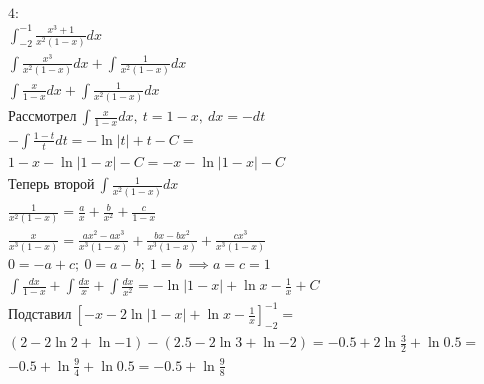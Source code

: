 \begin{multline}
    \text{4:}\\
    \int_{-2}^{-1} \frac{x^{3} + 1}{x^{2}(1 - x)} dx\\
    \int \frac{x^{3}}{x^{2}(1 - x)} dx + \int \frac{1}{x^{2}(1 - x)} dx\\
    \int \frac{x}{1 - x} dx + \int \frac{1}{x^{2}(1 - x)} dx\\
    \text{Рассмотрел}\ \int \frac{x}{1 - x} dx,\ t = 1 - x,\ dx = -dt\\
    - \int \frac{1 - t}{t} dt = - \ln{|t|} + t - C =\\
    1 - x - \ln{|1 - x|} - C = -x - \ln{|1 - x|} -C\\
    \text{Теперь второй}\  \int \frac{1}{x^{2}(1 - x)} dx\\
    \frac{1}{x^{2} (1 - x)} = \frac{a}{x} + \frac{b}{x^{2}} + \frac{c}{1 - x}\\
    \frac{x}{x^{3} (1 - x)} = \frac{ax^{2} - ax^3}{x^{3} (1 - x)} + \frac{bx - bx^{2}}{x^{3} (1 - x)} + \frac{cx^3}{x^{3} (1 - x)}\\
    0 = -a + c;\ 0 = a - b;\ 1 = b\ \implies a = c = 1\\
    \int \frac{dx}{1 - x} + \int \frac{dx}{x} + \int \frac{dx}{x^{2}} = -\ln{|1 - x|} + \ln{x} - \frac{1}{x} + C\\
    \text{Подставил}\ [-x - 2\ln{|1 - x|} + \ln{x} - \frac{1}{x}]_{-2}^{-1} =\\
    (2 - 2\ln{2} + \ln{-1}) - (2.5 - 2\ln{3} + \ln{-2}) = -0.5 + 2\ln{\frac{3}{2}} + \ln{0.5} =\\
    -0.5 + \ln{\frac{9}{4}} + \ln{0.5} = -0.5 + \ln{\frac{9}{8}}\\
\end{multline}



